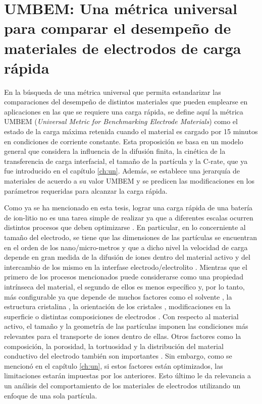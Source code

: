 \chapter{UMBEM: Una métrica universal para comparar el desempeño de materiales de electrodos de carga rápida}\label{ch:umbem}
\thispagestyle{empty}

\vspace{50pt}

\begin{adjustwidth}{50pt}{50pt}
    En la búsqueda de una métrica universal que permita estandarizar las 
    comparaciones del desempeño de distintos materiales que pueden emplearse en 
    aplicaciones en las que se requiere una carga rápida, se define aquí la 
    métrica UMBEM (\textit{Universal Metric for Benchmarking Electrode Materials}) como el 
    estado de la carga máxima retenida cuando el material es cargado por 15 
    minutos en condiciones de corriente constante. Esta proposición se basa 
    en un modelo general que considera la influencia de la difusión finita, 
    la cinética de la transferencia de carga interfacial, el tamaño de la partícula y la 
    C-rate, que ya fue introducido en el capítulo \ref{ch:un}. Además, se establece
    una jerarquía de materiales de acuerdo a su valor UMBEM y se predicen las 
    modificaciones en los parámetros requeridas para alcanzar la carga rápida.
\end{adjustwidth}

\clearpage
\newpage
\thispagestyle{empty}
\mbox{}
\newpage

Como ya se ha mencionado en esta tesis, lograr una carga rápida de una batería 
de ion-litio no es una tarea simple de realizar ya que a diferentes escalas 
ocurren distintos procesos que deben optimizarse \cite{franco2013}. En 
particular, en lo concerniente al tamaño del electrodo, se tiene que las dimensiones de las partículas se encuentran
en el orden de los nano/micro-metros y que a dicho nivel la velocidad de carga 
depende en gran medida de la difusión de iones dentro del material activo y del
intercambio de los mismo en la interfase electrodo/electrolito \cite{weiss2021}.
Mientras que el primero de los procesos mencionados puede considerarse como una 
propiedad intrínseca del material, el segundo de ellos es menos específico y, 
por lo tanto, más configurable ya que depende de muchos factores como el 
solvente \cite{levin2017}, la estructura cristalina \cite{li2022}, la
orientación de los cristales \cite{mala2020}, modificaciones en la superficie o 
distintas composiciones de electrodos \cite{kaur2022}. Con respecto al material
activo, el tamaño y la geometría de las partículas imponen las condiciones más
relevantes para el transporte de iones dentro de ellas. Otros factores como la 
composición, la porosidad, la tortuosidad y la distribución del material 
conductivo del electrodo también son importantes \cite{weiss2021}. Sin embargo,
como se mencionó en el capítulo \ref{ch:un}, si estos factores están 
optimizados, las limitaciones estarán impuestas por los anteriores. Esto último
le da relevancia a un análisis del comportamiento de los materiales de electrodos
utilizando un enfoque de una sola partícula.

